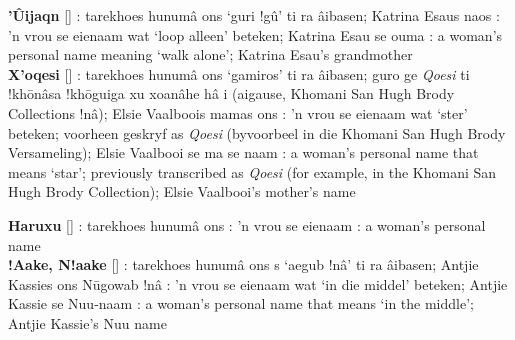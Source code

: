 \textbf{\textdoublevertline{}'\^{U}ijaqn}
[]
: tarekhoes \textdoublebarpipe{}hunum\^{a}
\textvertline{}ons `\textvertline{}guri !g\^{u}' ti ra
\textdoublebarpipe{}\^{a}ibasen; Katrina Esaus
\textdoublevertline{}naos : 'n vrou se eienaam wat `loop
alleen' beteken; Katrina Esau se ouma : a woman's
personal name meaning `walk alone'; Katrina Esau's grandmother \\

\textbf{\textdoublevertline{}X'oqesi}
[] :
tarekhoes \textdoublebarpipe{}hunum\^{a} \textvertline{}ons
`\textvertline{}gamiros' ti ra \textdoublebarpipe{}\^{a}ibasen;
\textdoublebarpipe{}guro ge \emph{\textdoublevertline{}Qoesi} ti
!kh\={o}\textdoublevertline{}n\^{a}sa
!kh\={o}\textdoublevertline{}guiga xu xoa\textdoublevertline{}n\^{a}he
h\^{a} i (ai\textdoublevertline{}gause, \textdoublebarpipe{}Khomani
San Hugh Brody Collections !n\^{a}); Elsie Vaalboois mamas
\textvertline{}ons : 'n vrou se eienaam wat `ster'
beteken; voorheen geskryf as \emph{\textdoublevertline{}Qoesi}
(byvoorbeel in die \textdoublebarpipe{}Khomani San Hugh Brody
Versameling); Elsie Vaalbooi se ma se naam : a woman's
personal name that means `star'; previously transcribed as
\emph{\textdoublevertline{}Qoesi} (for example, in the
\textdoublebarpipe{}Khomani San Hugh Brody Collection); Elsie
Vaalbooi's mother's name \\

\vspace{-.2em}

\textbf{\textdoublebarpipe{}Haruxu}
[] : tarekhoes
\textdoublebarpipe{}hunum\^{a} \textvertline{}ons : 'n
vrou se eienaam : a woman's personal name \\

\textbf{!Aake, N!aake} []
: tarekhoes \textdoublebarpipe{}hunum\^{a}
\textvertline{}ons s `\textdoublevertline{}aegub !n\^{a}' ti ra
\textdoublebarpipe{}\^{a}ibasen; Antjie Kassies \textvertline{}ons
\textvertline{}N\={u}gowab !n\^{a} : 'n vrou se eienaam
wat `in die middel' beteken; Antjie Kassie se N\textvertline{}uu-naam
: a woman's personal name that means `in the middle';
Antjie Kassie's N\textvertline{}uu name \\

